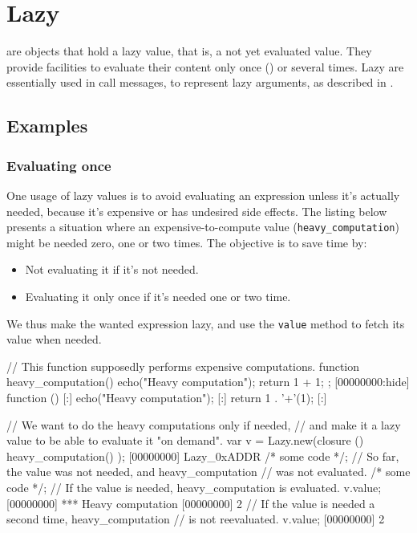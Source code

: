 \section{Lazy}

 are objects that hold a lazy value, that is, a not yet evaluated
value. They provide facilities to evaluate their content only once
() or several times. Lazy are essentially used in call
messages, to represent lazy arguments, as described in
.

\subsection{Examples}

\subsubsection{Evaluating once}

One usage of lazy values is to avoid evaluating an expression unless
it's actually needed, because it's expensive or has undesired side
effects. The listing below presents a situation where an
expensive-to-compute value (\lstinline|heavy_computation|) might be
needed zero, one or two times. The objective is to save time by:

\begin{itemize}
\item Not evaluating it if it's not needed.
\item Evaluating it only once if it's needed one or two time.
\end{itemize}

We thus make the wanted expression lazy, and use the \lstinline|value|
method to fetch its value when needed.

\begin{urbiscript}
// This function supposedly performs expensive computations.
function heavy_computation()
{
  echo("Heavy computation");
  return 1 + 1;
};
[00000000:hide] function () {
[:]  echo("Heavy computation");
[:]  return 1 . '+'(1);
[:]}

// We want to do the heavy computations only if needed,
// and make it a lazy value to be able to evaluate it "on demand".
var v = Lazy.new(closure () { heavy_computation() });
[00000000] Lazy_0xADDR
/* some code */;
// So far, the value was not needed, and heavy_computation
// was not evaluated.
/* some code */;
// If the value is needed, heavy_computation is evaluated.
v.value;
[00000000] *** Heavy computation
[00000000] 2
// If the value is needed a second time, heavy_computation
// is not reevaluated.
v.value;
[00000000] 2
\end{urbiscript}

